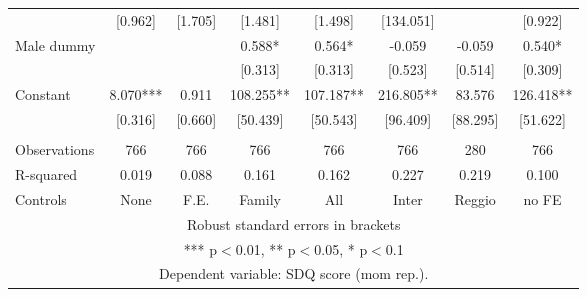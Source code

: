 \begin{tabular}{lccccccc}
 & [0.962] & [1.705] & [1.481] & [1.498] & [134.051] &  & [0.922] \\
Male dummy &  &  & 0.588* & 0.564* & -0.059 & -0.059 & 0.540* \\
 &  &  & [0.313] & [0.313] & [0.523] & [0.514] & [0.309] \\
Constant & 8.070*** & 0.911 & 108.255** & 107.187** & 216.805** & 83.576 & 126.418** \\
 & [0.316] & [0.660] & [50.439] & [50.543] & [96.409] & [88.295] & [51.622] \\
 &  &  &  &  &  &  &  \\
Observations & 766 & 766 & 766 & 766 & 766 & 280 & 766 \\
R-squared & 0.019 & 0.088 & 0.161 & 0.162 & 0.227 & 0.219 & 0.100 \\
 Controls & None & F.E. & Family & All & Inter & Reggio & no FE \\ \hline
\multicolumn{8}{c}{ Robust standard errors in brackets} \\
\multicolumn{8}{c}{ *** p$<$0.01, ** p$<$0.05, * p$<$0.1} \\
\multicolumn{8}{c}{ Dependent variable: SDQ score (mom rep.).} \\
\end{tabular}
